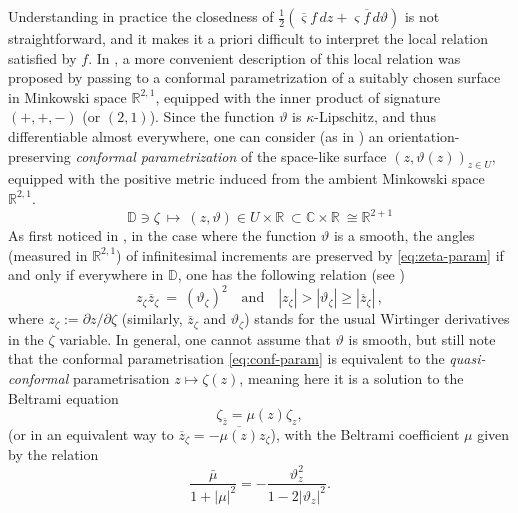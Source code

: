 \documentclass[reqno]{amsart}
\numberwithin{equation}{section}
\theoremstyle{definition}
\theoremstyle{remark}
\newcommand\C{\mathbb{C}}
\newcommand\R{\mathbb{R}}
\begin{document}
Understanding in practice the closedness of $\tfrac{1}{2}(\overline{\varsigma} f\, dz + \varsigma \overline{f}\, d\vartheta)$ is not straightforward, and it makes it a priori difficult to interpret the local relation satisfied by $f$. In \cite[Section~2.7]{Che20}, a more convenient description of this local relation was proposed by passing to a conformal parametrization of a suitably chosen surface in Minkowski space $\R^{2,1}$, equipped with the inner product of signature $(+,+,-)$ (or $(2,1)$). Since the function $\vartheta$ is $\kappa$-Lipschitz, and thus differentiable almost everywhere, one can consider (as in \cite[Equation~(2.26)]{Che20}) an orientation-preserving \emph{conformal parametrization} of the space-like surface $(z, \vartheta(z))_{z \in U}$, equipped with the positive metric induced from the ambient Minkowski space $\R^{2,1}$.\begin{equation}
\label{eq:zeta-param}
 \mathbb{D} \ni\zeta\ \mapsto\ (z,\vartheta)\in U\times\R\  \subset \C\times\R \ \cong \R^{2+1}
\end{equation}
As first noticed in \cite[below Equation (2.26)]{Che20}, in the case where the function $\vartheta $ is a smooth, the angles (measured in $\R^{2,1}$) of infinitesimal increments are preserved by \eqref{eq:zeta-param} if and only if everywhere in $\mathbb{D}$, one has the following relation (see  \cite[Equation (2.27)]{Che20})
\begin{equation}
\label{eq:conf-param}
z_\zeta\overline{z}_\zeta\ =\ (\vartheta_\zeta)^2\quad \text{and}\quad |z_\zeta|>|\vartheta_\zeta|\ge |\overline{z}_\zeta|\,,
\end{equation}
where $z_\zeta:=\partial z/\partial\zeta$ (similarly, $\overline{z}_\zeta$ and $\vartheta_\zeta$) stands for the usual Wirtinger derivatives in the $\zeta $ variable. In general, one cannot assume that  $\vartheta$ is smooth, but still note that the conformal parametrisation \eqref{eq:conf-param} is equivalent to the \emph{quasi-conformal} parametrisation $z\mapsto \zeta(z)$, meaning here it is a solution to the Beltrami equation
\begin{equation}\label{eq:Beltrami-equation}
\zeta_{\bar{z}}=\mu(z)\zeta_{z},
\end{equation}
(or in an equivalent way to $\overline{z}_{\zeta}= - \overline{\mu(z)} z_{\zeta}$), with the Beltrami coefficient $\mu$ given by the relation
\begin{equation}\label{eq:Beltrami-coefficient}
\frac{\bar{\mu}}{1+|\mu|^2}= - \frac{\vartheta_{z}^2}{1-2|\vartheta_z|^2}.
\end{equation}
\end{document}
